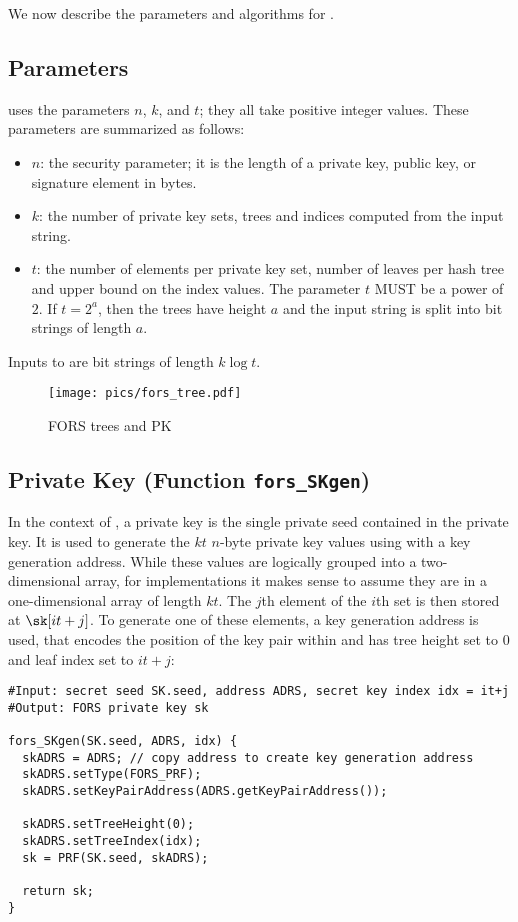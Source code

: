%
We now describe the parameters and algorithms for \fors.

\subsection{\fors Parameters}\label{sec:fors:params}
\fors uses the parameters $n$, $k$, and $t$; they all take positive integer
values.
These parameters are summarized as follows:
\begin{itemize}
  \item $n$: the security parameter; it is the length of a private key, public
  key, or signature element in bytes.
  \item $k$: the number of private key sets, trees and indices computed
  from the input string.
  \item $t$: the number of elements per private key set, number of leaves per
  hash tree and upper bound on the index values. The parameter $t$ MUST
  be a power of $2$. If $t = 2^a$, then the trees have height $a$ and the
  input string is split into bit strings of length $a$.
\end{itemize}
Inputs to \fors are bit strings of length $k\log t$.

\begin{figure}[htb]
\texttt{[image: pics/fors\_tree.pdf]}
\caption{FORS trees and PK}
\end{figure}

\subsection{\fors Private Key (Function \texttt{fors\_SKgen})}
In the context of \spx, a \fors private key is the single private seed \sseed
contained in the \spx private key. It is used to generate the $kt$ $n$-byte
private key values using \sphincsPRF with a \fors key generation address. While these values are
logically grouped into a two-dimensional array, for implementations it makes sense to assume they
are in a one-dimensional array of length $kt$.
The $j$th element of the $i$th set is then stored at $\sk[it + j]$.
To generate one of these elements, a \fors key generation address \skadrs is used, that encodes the
position of the \fors key pair within \spx and has
tree height set to $0$ and leaf index set to $it+j$:

\begin{lstlisting}[label=alg:fors_skgen, language=pseudoc,
                   caption=\texttt{fors\_SKgen} -- Computing a \fors private key value.]
#Input: secret seed SK.seed, address ADRS, secret key index idx = it+j
#Output: FORS private key sk

fors_SKgen(SK.seed, ADRS, idx) {
  skADRS = ADRS; // copy address to create key generation address
  skADRS.setType(FORS_PRF);
  skADRS.setKeyPairAddress(ADRS.getKeyPairAddress());

  skADRS.setTreeHeight(0);
  skADRS.setTreeIndex(idx);
  sk = PRF(SK.seed, skADRS);

  return sk;
}
\end{lstlisting}

